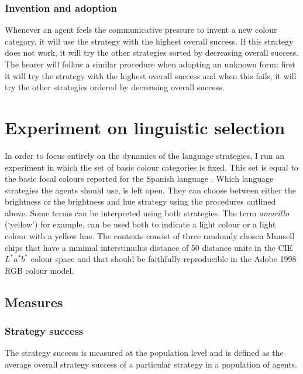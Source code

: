 \subsubsection{Invention and adoption}

Whenever an agent feels the communicative pressure to invent a new
colour category, it will use the strategy with the highest overall
success. If this strategy does not work, it will try the other
strategies sorted by decreasing overall success. The hearer will
follow a similar procedure when adopting an unknown form: first it
will try the strategy with the highest overall success and when this
fails, it will try the other strategies ordered by decreasing overall
success.

\section{Experiment on linguistic selection}

In order to focus entirely on the dynamics of the language strategies,
I run an experiment in which the set of basic colour categories is
fixed. This set is equal to the basic focal colours reported for the
Spanish language \citep{lillo07locating}. Which language strategies
the agents should use, is left open. They can choose between either
the brightness or the brightness and hue strategy using
the procedures outlined above. Some terms can be interpreted using
both strategies. The term \textit{amarillo} (`yellow') for example, can be
used both to indicate a light colour or a light colour with a yellow
hue. The contexts consist of three randomly chosen Munsell chips
that have a minimal interstimulus distance of 50 distance units in the CIE
$L^*a^*b^*$ colour space and that should be faithfully reproducible in the
Adobe 1998 RGB colour model.

\subsection{Measures}

\subsubsection{Strategy success}

The strategy success is measured at the population level and is
defined as the average overall strategy success of a particular
strategy in a population of agents.

